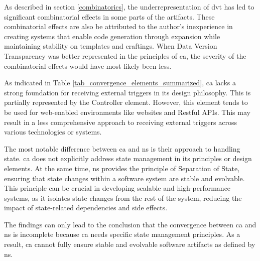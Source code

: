 As described in section \ref{combinatorics}, the underrepresentation of \gls{dvt} has
led to significant combinatorial effects in some parts of the artifacts. These
combinatorial effects are also be attributed to the author's inexperience in creating
systems that enable code generation through expansion while maintaining stability on
templates and craftings. When Data Version Transparency was better represented in the
principles of \gls{ca}, the severity of the combinatorial effects would have most likely
been less.

As indicated in Table \ref{tab_convergence_elements_summarized}, \gls{ca} lacks a strong
foundation for receiving external triggers in its design philosophy. This is partially
represented by the Controller element. However, this element tends to be used for
web-enabled environments like websites and Restful APIs. This may result in a less
comprehensive approach to receiving external triggers across various technologies or
systems.

The most notable difference between \gls{ca} and \gls{ns} is their approach to handling
state. \gls{ca} does not explicitly address state management in its principles or design
elements. At the same time, \gls{ns} provides the principle of Separation of State,
ensuring that state changes within a software system are stable and evolvable. This
principle can be crucial in developing scalable and high-performance systems, as it
isolates state changes from the rest of the system, reducing the impact of state-related
dependencies and side effects. 

The findings can only lead to the conclusion that the convergence between \gls{ca} and
\gls{ns} is incomplete because \gls{ca} needs specific state management principles. As a
result, \gls{ca} cannot fully ensure stable and evolvable software artifacts as defined by
\gls{ns}.






